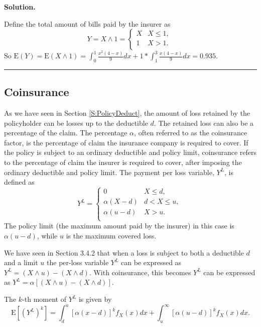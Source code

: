 \documentclass[]{book}
\theoremstyle{definition}
\theoremstyle{definition}
\theoremstyle{definition}
\theoremstyle{remark}
\begin{document}
\textbf{Solution.}

Define the total amount of bills paid by the insurer as
\[Y = X \land 1 = \left\{ \begin{matrix}
X & X \leq 1, \\
1 & X > 1. \\
\end{matrix} \right.\ \] So
\(\mathrm{E}\left( Y \right) = \mathrm{E}\left( X \land 1 \right) = \int_{0}^{1}\frac{x^{2}(4 - x)}{9}dx + 1 * \int_{1}^{3}\frac{x\left( 4 - x \right)}{9}dx = 0.935\).

\begin{center}\rule{0.5\linewidth}{\linethickness}\end{center}

\subsection{Coinsurance}\label{coinsurance}

As we have seen in Section \ref{S:PolicyDeduct}, the amount of loss
retained by the policyholder can be losses up to the deductible \(d\).
The retained loss can also be a percentage of the claim. The percentage
\(\alpha\), often referred to as the coinsurance factor, is the
percentage of claim the insurance company is required to cover. If the
policy is subject to an ordinary deductible and policy limit,
coinsurance refers to the percentage of claim the insurer is required to
cover, after imposing the ordinary deductible and policy limit. The
payment per loss variable, \(Y^{L}\), is defined as
\[Y^{L} = \left\{ \begin{matrix}
0 & X \leq d, \\
\alpha\left( X - d \right) & d <  X \leq u, \\
\alpha\left( u - d \right) & X > u. \\
\end{matrix} \right.\ \] The policy limit (the maximum amount paid by
the insurer) in this case is \(\alpha\left( u - d \right)\), while \(u\)
is the maximum covered loss.

We have seen in Section 3.4.2 that when a loss is subject to both a
deductible \(d\) and a limit \(u\) the per-loss variable \(Y^L\) can be
expressed as \(Y^L=\left(X\land u\right)-\left(X\land d\right)\). With
coinsurance, this becomes \(Y^L\) can be expressed as
\(Y^L=\alpha\left[(X\land u)-(X\land d)\right]\).

The \(k\)-th moment of \(Y^{L}\) is given by
\[\mathrm{E}\left\lbrack \left( Y^{L} \right)^{k} \right\rbrack = \int_{d}^{u}\left\lbrack \alpha\left( x - d \right) \right\rbrack^{k}f_{X}\left( x \right)dx + \int_{u}^{\infty}\left\lbrack \alpha\left( u - d \right) \right\rbrack^{k}f_{X}\left( x \right) dx .\]
\end{document}
